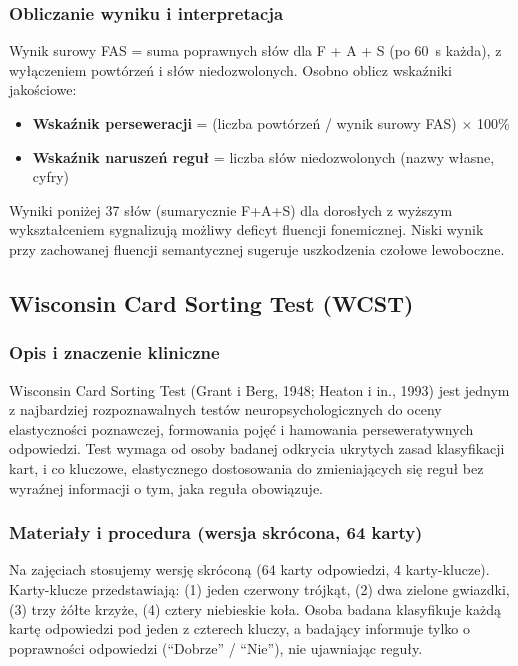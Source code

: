 \documentclass[11pt,a4paper]{article}
\begin{document}
\subsubsection{Obliczanie wyniku i interpretacja}

Wynik surowy FAS = suma poprawnych słów dla F + A + S (po 60~s każda), z wyłączeniem powtórzeń i słów niedozwolonych. Osobno oblicz wskaźniki jakościowe:

\begin{itemize}
  \item \textbf{Wskaźnik perseweracji} = (liczba powtórzeń / wynik surowy FAS) $\times$ 100\%
  \item \textbf{Wskaźnik naruszeń reguł} = liczba słów niedozwolonych (nazwy własne, cyfry)
\end{itemize}

Wyniki poniżej 37 słów (sumarycznie F+A+S) dla dorosłych z wyższym wykształceniem sygnalizują możliwy deficyt fluencji fonemicznej. Niski wynik przy zachowanej fluencji semantycznej sugeruje uszkodzenia czołowe lewoboczne.

\subsection{Wisconsin Card Sorting Test (WCST)}

\subsubsection{Opis i znaczenie kliniczne}

Wisconsin Card Sorting Test (Grant i Berg, 1948; Heaton i in., 1993) jest jednym z najbardziej rozpoznawalnych testów neuropsychologicznych do oceny elastyczności poznawczej, formowania pojęć i hamowania perseweratywnych odpowiedzi. Test wymaga od osoby badanej odkrycia ukrytych zasad klasyfikacji kart, i co kluczowe, elastycznego dostosowania do zmieniających się reguł bez wyraźnej informacji o tym, jaka reguła obowiązuje.

\subsubsection{Materiały i procedura (wersja skrócona, 64 karty)}

Na zajęciach stosujemy wersję skróconą (64 karty odpowiedzi, 4 karty-klucze). Karty-klucze przedstawiają: (1) jeden czerwony trójkąt, (2) dwa zielone gwiazdki, (3) trzy żółte krzyże, (4) cztery niebieskie koła. Osoba badana klasyfikuje każdą kartę odpowiedzi pod jeden z czterech kluczy, a badający informuje tylko o poprawności odpowiedzi (``Dobrze'' / ``Nie''), nie ujawniając reguły.
\end{document}
